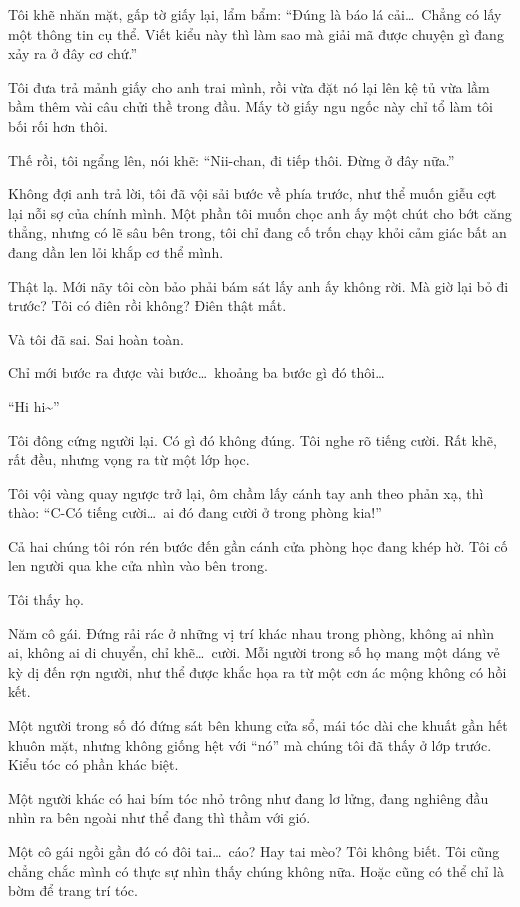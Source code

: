 \documentclass[../main.tex]{subfiles}
\begin{document}
Tôi khẽ nhăn mặt, gấp tờ giấy lại, lẩm bẩm: ``Đúng là báo lá cải\dots\ Chẳng có lấy một thông tin cụ thể. Viết kiểu này thì làm sao mà giải mã được chuyện gì đang xảy ra ở đây cơ chứ.''

Tôi đưa trả mảnh giấy cho anh trai mình, rồi vừa đặt nó lại lên kệ tủ vừa lầm bầm thêm vài câu chửi thề trong đầu. Mấy tờ giấy ngu ngốc này chỉ tổ làm tôi bối rối hơn thôi.

Thế rồi, tôi ngẩng lên, nói khẽ: ``Nii-chan, đi tiếp thôi. Đừng ở đây nữa.''

Không đợi anh trả lời, tôi đã vội sải bước về phía trước, như thể muốn giễu cợt lại nỗi sợ của chính mình. Một phần tôi muốn chọc anh ấy một chút cho bớt căng thẳng, nhưng có lẽ sâu bên trong, tôi chỉ đang cố trốn chạy khỏi cảm giác bất an đang dần len lỏi khắp cơ thể mình.

Thật lạ. Mới nãy tôi còn bảo phải bám sát lấy anh ấy không rời. Mà giờ lại bỏ đi trước? Tôi có điên rồi không? Điên thật mất.

Và tôi đã sai. Sai hoàn toàn.

Chỉ mới bước ra được vài bước\dots\ khoảng ba bước gì đó thôi\dots

``Hi hi\~{}''

Tôi đông cứng người lại. Có gì đó không đúng. Tôi nghe rõ tiếng cười. Rất khẽ, rất đều, nhưng vọng ra từ một lớp học.

Tôi vội vàng quay ngược trở lại, ôm chầm lấy cánh tay anh theo phản xạ, thì thào: ``C-Có tiếng cười\dots\ ai đó đang cười ở trong phòng kia!''

Cả hai chúng tôi rón rén bước đến gần cánh cửa phòng học đang khép hờ. Tôi cố len người qua khe cửa nhìn vào bên trong.

Tôi thấy họ.

Năm cô gái. Đứng rải rác ở những vị trí khác nhau trong phòng, không ai nhìn ai, không ai di chuyển, chỉ khẽ\dots\ cười. Mỗi người trong số họ mang một dáng vẻ kỳ dị đến rợn người, như thể được khắc họa ra từ một cơn ác mộng không có hồi kết.


Một người trong số đó đứng sát bên khung cửa sổ, mái tóc dài che khuất gần hết khuôn mặt, nhưng không giống hệt với ``nó'' mà chúng tôi đã thấy ở lớp trước. Kiểu tóc có phần khác biệt.

Một người khác có hai bím tóc nhỏ trông như đang lơ lửng, đang nghiêng đầu nhìn ra bên ngoài như thể đang thì thầm với gió.

Một cô gái ngồi gần đó có đôi tai\dots\ cáo? Hay tai mèo? Tôi không biết. Tôi cũng chẳng chắc mình có thực sự nhìn thấy chúng không nữa. Hoặc cũng có thể chỉ là bờm để trang trí tóc.
\end{document}
